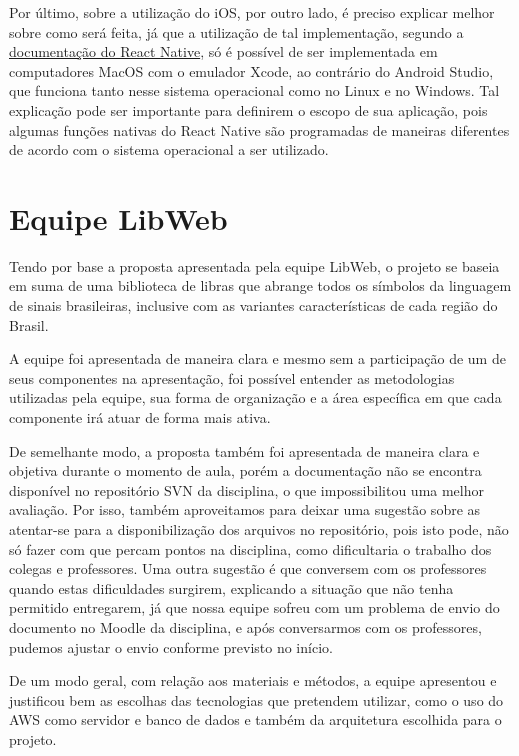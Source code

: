 Por último, sobre a utilização do iOS, por outro lado, é preciso explicar melhor sobre como será feita, já que a utilização de tal implementação, segundo a \href{https://reactnative.dev/docs/environment-setup}{documentação do React Native}, só é possível de ser implementada em computadores MacOS com o emulador Xcode, ao contrário do Android Studio, que funciona tanto nesse sistema operacional como no Linux e no Windows. Tal explicação pode ser importante para definirem o escopo de sua aplicação, pois algumas funções nativas do React Native são programadas de maneiras diferentes de acordo com o sistema operacional a ser utilizado.

\section{Equipe LibWeb}
Tendo por base a proposta apresentada pela equipe LibWeb, o projeto se baseia em suma de uma biblioteca de libras que abrange todos os símbolos da linguagem de sinais brasileiras, inclusive com as variantes características de cada região do Brasil.

A equipe foi apresentada de maneira clara e mesmo sem a participação de um de seus componentes na apresentação, foi possível entender as metodologias utilizadas pela equipe, sua forma de organização e a área específica em que cada componente irá atuar de forma mais ativa.

De semelhante modo, a proposta também foi apresentada de maneira clara e objetiva durante o momento de aula, porém a documentação não se encontra disponível no repositório SVN da disciplina, o que impossibilitou uma melhor avaliação. Por isso, também aproveitamos para deixar uma sugestão sobre as atentar-se para a disponibilização dos arquivos no repositório, pois isto pode, não só fazer com que percam pontos na disciplina, como dificultaria o trabalho dos colegas e professores. Uma outra sugestão é que conversem com os professores quando estas dificuldades surgirem, explicando a situação que não tenha permitido entregarem, já que nossa equipe sofreu com um problema de envio do documento no Moodle da disciplina, e após conversarmos com os professores, pudemos ajustar o envio conforme previsto no início.

De um modo geral, com relação aos materiais e métodos, a equipe apresentou e justificou bem as escolhas das tecnologias que pretendem utilizar, como o uso do AWS como servidor e banco de dados e também da arquitetura escolhida para o projeto.

